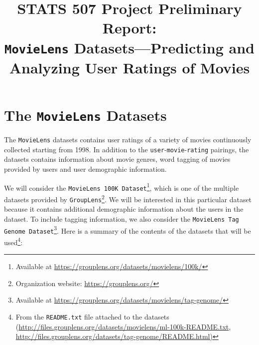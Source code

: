 \documentclass[bj, preprint]{imsart}
\begin{document}
\begin{frontmatter}

\title{{\Large STATS 507 Project Preliminary Report:} \\ 
\bf \texttt{MovieLens} Datasets---Predicting and Analyzing User Ratings of Movies}






\tableofcontents
\listoftodos
\end{frontmatter}



\section{The \texttt{MovieLens} Datasets}\label{sec:dataset}

The \texttt{MovieLens} datasets \citep{harper2015MovieLensDatasetsHistory} contains user ratings of a variety of movies continuously collected starting from 1998. 
In addition to the \texttt{user}-\texttt{movie}-\texttt{rating} pairings, the datasets contains information about movie genres, word tagging of movies provided by users and user demographic information. 

We will consider the \texttt{MovieLens 100K Dataset}\footnote{Available at \url{https://grouplens.org/datasets/movielens/100k/}}, which is one of the multiple datasets provided by \texttt{GroupLens}\footnote{Organization website: \url{https://grouplens.org/}}. 
We will be interested in this particular dataset because it contains additional demographic information about the users in the dataset. 
To include tagging information, we also consider the \texttt{MovieLens Tag Genome Dataset}\footnote{Available at \url{https://grouplens.org/datasets/movielens/tag-genome/}}. 
Here is a summary of the contents of the datasets that will be used\footnote{From the \texttt{README.txt} file attached to the datasets (\url{http://files.grouplens.org/datasets/movielens/ml-100k-README.txt}, \url{http://files.grouplens.org/datasets/tag-genome/README.html)}}:
\end{document}
